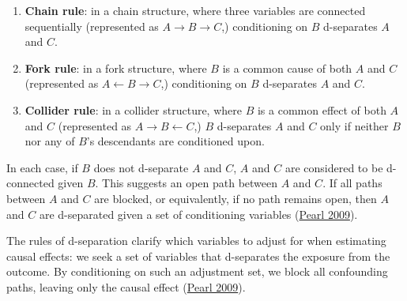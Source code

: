 \documentclass[
  singlecolumn]{article}
\begin{document}
\begin{enumerate}
\def\labelenumi{\alph{enumi}.}
\item
  \textbf{Chain rule}: in a chain structure, where three variables are
  connected sequentially (represented as
  \(A \rightarrow B \rightarrow C\),) conditioning on \(B\) d-separates
  \(A\) and \(C\).
\item
  \textbf{Fork rule}: in a fork structure, where \(B\) is a common cause
  of both \(A\) and \(C\) (represented as
  \(A \leftarrow B \rightarrow C\),) conditioning on \(B\) d-separates
  \(A\) and \(C\).
\item
  \textbf{Collider rule}: in a collider structure, where \(B\) is a
  common effect of both \(A\) and \(C\) (represented as
  \(A \rightarrow B \leftarrow C\),) \(B\) d-separates \(A\) and \(C\)
  only if neither \(B\) nor any of \(B\)'s descendants are conditioned
  upon.
\end{enumerate}

In each case, if \(B\) does not d-separate \(A\) and \(C\), \(A\) and
\(C\) are considered to be d-connected given \(B\). This suggests an
open path between \(A\) and \(C\). If all paths between \(A\) and \(C\)
are blocked, or equivalently, if no path remains open, then \(A\) and
\(C\) are d-separated given a set of conditioning variables
(\protect\hyperlink{ref-pearl2009}{Pearl 2009}).

The rules of d-separation clarify which variables to adjust for when
estimating causal effects: we seek a set of variables that d-separates
the exposure from the outcome. By conditioning on such an adjustment
set, we block all confounding paths, leaving only the causal effect
(\protect\hyperlink{ref-pearl2009}{Pearl 2009}).
\end{document}
